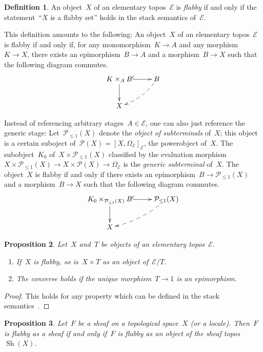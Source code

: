 \documentclass[oneside]{amsart}
\theoremstyle{definition}
\newtheorem{defn}{Definition}[section]
\theoremstyle{plain}
\newtheorem{prop}[defn]{Proposition}
\theoremstyle{remark}
\newcommand{\E}{\mathcal{E}}
\renewcommand{\P}{\mathcal{P}}
\DeclareMathOperator{\Sh}{Sh}
\renewcommand{\_}{\mathpunct{.}\,}
\begin{document}
\begin{defn}An object~$X$ of an elementary topos~$\E$ is \emph{flabby} if and
only if the statement~``$X$ is a flabby set'' holds in the stack semantics
of~$\E$.\end{defn}

This definition amounts to the following: An object~$X$ of an elementary
topos~$\E$ is flabby if and only if, for any monomorphism~$K \to A$ and any
morphism~$K \to X$, there exists an epimorphism~$B \to A$ and a morphism~$B
\to X$ such that the following diagram commutes.
\[ \xymatrix{
  K \times_A B \ar@{^{(}->}[r]\ar[d] & B \ar@{-->}@/^/[ld] \\
  X
} \]

Instead of referencing arbitrary stages~$A \in \E$, one can also just reference
the generic stage: Let~$\P_{\leq1}(X)$ denote the \emph{object of subterminals}
of~$X$; this object is a certain suboject of~$\P(X) = [X,\Omega_\E]_\E$, the
powerobject of~$X$. The subobject~$K_0$ of~$X \times \P_{\leq1}(X)$ classified by the
evaluation morphism~$X \times \P_{\leq1}(X) \to X \times \P(X) \to \Omega_\E$
is the \emph{generic subterminal} of~$X$. The object~$X$ is flabby if and only
if there exists an epimorphism~$B \to \P_{\leq1}(X)$ and a morphism~$B \to X$
such that the following diagram commutes.
\[ \xymatrix{
  K_0 \times_{\P_{\leq1}(X)} B \ar@{^{(}->}[r]\ar[d] & \P_{\leq1}(X) \ar@{-->}@/^/[ld] \\
  X
} \]

\begin{prop}\label{prop:basic-properties-of-flabby-objects}
Let~$X$ and~$T$ be objects of an elementary topos~$\E$.
\begin{enumerate}
\item If~$X$ is flabby, so is~$X \times T$ as an object of~$\E/T$.
\item The converse holds if the unique morphism~$T \to 1$ is an epimorphism.
\end{enumerate}
\end{prop}

\begin{proof}This holds for any property which can be defined
in the stack semantics~\cite[Lemma~7.3]{shulman:stack-semantics}.
\end{proof}

\begin{prop}\label{prop:flabby-sheaves-objects}
Let~$F$ be a sheaf on a topological space~$X$ (or a locale).
Then~$F$ is flabby as a sheaf if and only if~$F$ is flabby as an object of the
sheaf topos~$\Sh(X)$.
\end{prop}
\end{document}
